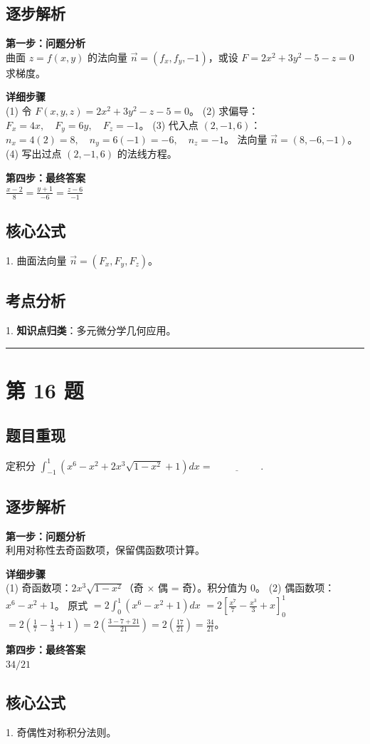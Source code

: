 \documentclass[10pt, a4paper]{ctexart}
\newcommand{\problemheader}{
    \vspace{0.5cm}
    \noindent\rule[0.5ex]{\linewidth}{2pt} %
}
\newcommand{\analysisheader}{
    \vspace{0.2cm}
    \noindent{\color{red}\rule[0.5ex]{\linewidth}{0.5pt}} %
    \vspace{0.1cm}
}
\begin{document}
\analysisheader
{\color{red}
\subsection*{逐步解析}
\textbf{第一步：问题分析} \\
曲面 $z=f(x,y)$ 的法向量 $\vec{n} = (f_x, f_y, -1)$，或设 $F = 2x^2+3y^2-5-z=0$ 求梯度。

\textbf{详细步骤} \\
(1) 令 $F(x,y,z) = 2x^2 + 3y^2 - z - 5 = 0$。
(2) 求偏导：
$F_x = 4x, \quad F_y = 6y, \quad F_z = -1$。
(3) 代入点 $(2, -1, 6)$：
$n_x = 4(2) = 8, \quad n_y = 6(-1) = -6, \quad n_z = -1$。
法向量 $\vec{n} = (8, -6, -1)$。
(4) 写出过点 $(2, -1, 6)$ 的法线方程。

\textbf{第四步：最终答案} \\
$\frac{x-2}{8} = \frac{y+1}{-6} = \frac{z-6}{-1}$

\subsection*{核心公式}
1. 曲面法向量 $\vec{n} = (F_x, F_y, F_z)$。

\subsection*{考点分析}
1. \textbf{知识点归类}：多元微分学几何应用。
}

\problemheader
\section*{第 16 题}
\subsection*{题目重现}
定积分 $\int_{-1}^{1} (x^6 - x^2 + 2x^3\sqrt{1-x^2} + 1) dx = \underline{\hspace{2cm}}$.

\analysisheader
{\color{red}
\subsection*{逐步解析}
\textbf{第一步：问题分析} \\
利用对称性去奇函数项，保留偶函数项计算。

\textbf{详细步骤} \\
(1) 奇函数项：$2x^3\sqrt{1-x^2}$（奇 $\times$ 偶 = 奇）。积分值为 0。
(2) 偶函数项：$x^6 - x^2 + 1$。
原式 $= 2 \int_0^1 (x^6 - x^2 + 1) dx$
$= 2 \left[ \frac{x^7}{7} - \frac{x^3}{3} + x \right]_0^1$
$= 2 \left( \frac{1}{7} - \frac{1}{3} + 1 \right) = 2 \left( \frac{3 - 7 + 21}{21} \right) = 2 \left( \frac{17}{21} \right) = \frac{34}{21}$。

\textbf{第四步：最终答案} \\
$34/21$

\subsection*{核心公式}
1. 奇偶性对称积分法则。
}
\end{document}
